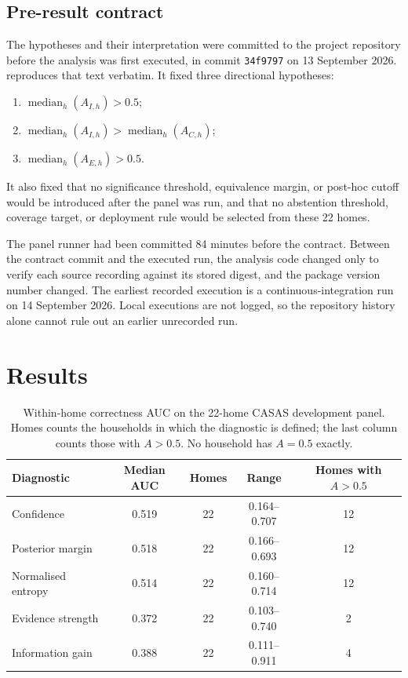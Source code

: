 \documentclass[11pt]{article}
\renewcommand{\_}{\textunderscore\allowbreak}
\begin{document}
\subsection{Pre-result contract}
\label{sec:contract}
The hypotheses and their interpretation were committed to the project repository before the analysis was first executed, in commit \texttt{34f9797} on 13 September 2026.  reproduces that text verbatim. It fixed three directional hypotheses:
\begin{enumerate}[label=H\arabic*.,leftmargin=*]
\item $\operatorname{median}_h(A_{I,h})>0.5$;
\item $\operatorname{median}_h(A_{I,h})>\operatorname{median}_h(A_{C,h})$;
\item $\operatorname{median}_h(A_{E,h})>0.5$.
\end{enumerate}
It also fixed that no significance threshold, equivalence margin, or post-hoc cutoff would be introduced after the panel was run, and that no abstention threshold, coverage target, or deployment rule would be selected from these 22 homes.

The panel runner had been committed 84 minutes before the contract. Between the contract commit and the executed run, the analysis code changed only to verify each source recording against its stored digest, and the package version number changed. The earliest recorded execution is a continuous-integration run on 14 September 2026. Local executions are not logged, so the repository history alone cannot rule out an earlier unrecorded run.

\section{Results}
\begin{table}[ht]
\centering
\caption{Within-home correctness AUC on the 22-home CASAS development panel. Homes counts the households in which the diagnostic is defined; the last column counts those with $A>0.5$. No household has $A=0.5$ exactly.}
\label{tab:separation}
\begin{tabular}{lcccc}
\toprule
Diagnostic & Median AUC & Homes & Range & Homes with $A>0.5$ \\
\midrule
Confidence & 0.519 & 22 & 0.164--0.707 & 12 \\
Posterior margin & 0.518 & 22 & 0.166--0.693 & 12 \\
Normalised entropy & 0.514 & 22 & 0.160--0.714 & 12 \\
Evidence strength & 0.372 & 22 & 0.103--0.740 & 2 \\
Information gain & 0.388 & 22 & 0.111--0.911 & 4 \\
\bottomrule
\end{tabular}
\end{table}
\end{document}
